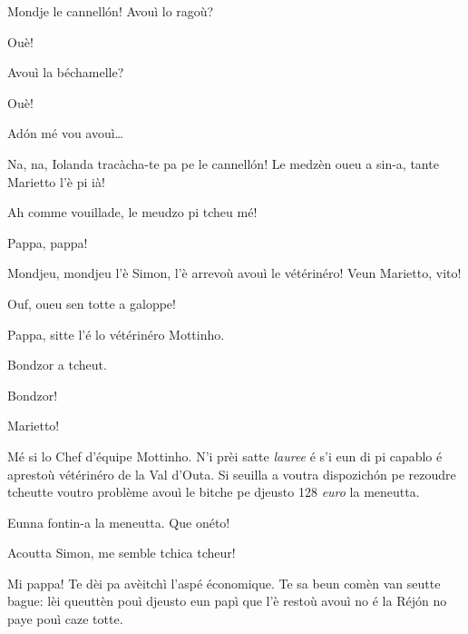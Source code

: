 \begin{drama}
\Mariettospeaks Mondje le cannell\'on! Avouì lo ragoù?

\Iolandaspeaks Ouè!

\Mariettospeaks Avouì la béchamelle?

\Iolandaspeaks Ouè!

\Mariettospeaks {} Ad\'on mé vou avouì\ldots

\Cienspeaks {} Na, na, Iolanda tra\-cà\-cha-te pa pe le cannell\'on! Le medzèn oueu a sin-a, tante Marietto l'è pi ià!

\Iolandaspeaks Ah comme vouillade, le meudzo pi tcheu mé!


\Simonspeaks {} Pappa, pappa!

\Cienspeaks Mondjeu, mondjeu l'è Simon, l'è arrevoù avouì le vétérinéro! Veun Marietto, vito!

\Mariettospeaks Ouf, oueu sen totte a galoppe!


\Simonspeaks {} Pappa, sitte l’é lo vétérinéro Mottinho.

\Chefspeaks {} Bondzor a tcheut. 

\Simonspeaks {} Bondzor!

\Mariettospeaks Marietto!

\Chefspeaks Mé si lo Chef d’équipe Mottinho. N'i prèi satte \textit{lauree} é s’i eun di pi capablo é aprestoù vétérinéro de la Val d'Outa. Si seuilla a voutra dispozich\'on pe rezoudre tcheutte voutro problème avouì le bitche pe djeusto 128 \textit{euro} la meneutta.

\Mariettospeaks {} Eunna fontin-a la meneutta. Que onéto!


\Cienspeaks {} Acoutta Simon,  me semble tchica tcheur!

\Simonspeaks Mi pappa! Te dèi pa avèitchì l'aspé économique. Te sa beun comèn van seutte bague: lèi queuttèn pouì djeusto eun papì que l’è restoù avouì no é la Réj\'on no paye pouì caze totte.


\end{drama}
